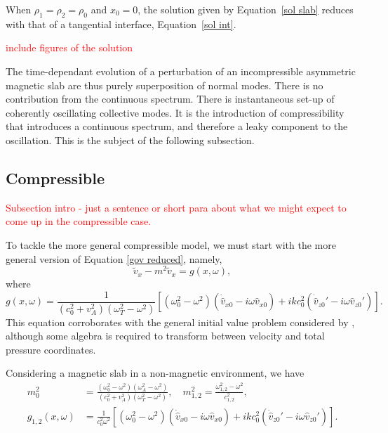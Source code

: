 \documentclass[12pt]{../style-files/ociamthesis}
\begin{document}
When $\rho_1 = \rho_2 = \rho_0$ and $x_0 = 0$, the solution given by Equation~\eqref{sol slab} reduces with that of a tangential interface, Equation~\eqref{sol int}.

\textcolor{red}{include figures of the solution}

The time-dependant evolution of a perturbation of an incompressible asymmetric magnetic slab are thus purely superposition of normal modes. There is no contribution from the continuous spectrum. There is instantaneous set-up of coherently oscillating collective modes. It is the introduction of compressibility that introduces a continuous spectrum, and therefore a leaky component to the oscillation. This is the subject of the following subsection.


\subsection{Compressible}

\textcolor{red}{Subsection intro - just a sentence or short para about what we might expect to come up in the compressible case.}

To tackle the more general compressible model, we must start with the more general version of Equation \eqref{gov reduced}, namely,
\begin{equation}
\tilde{v}_x - m^2 \tilde{v}_x = g(x, \omega),
\end{equation}
where
\begin{equation}
g(x, \omega) = \frac{1}{(c_0^2 + v_A^2)(\omega_T^2 - \omega^2)}\left[ (\omega_0^2 - \omega^2)\left(\dot{\hat{v}}_{x0} - i\omega \hat{v}_{x0}\right) + ikc_0^2\left( \dot{\hat{v}}_{z0}' - i\omega \hat{v}_{z0}'\right) \right].
\end{equation}
This equation corroborates with the general initial value problem considered by \cite{and_etal07}, although some algebra is required to transform between velocity and total pressure coordinates.

Considering a magnetic slab in a non-magnetic environment, we have
\begin{align}
m_0^2 &= \frac{(\omega_0^2 - \omega^2)(\omega_A^2 - \omega^2)}{(c_0^2 + v_A^2)(\omega_T^2 - \omega^2)}, \quad m_{1,2}^2 = \frac{\omega_{1,2}^2 - \omega^2}{c_{1,2}^2}, \\
g_{1,2}(x, \omega) &= \frac{1}{c_0^2\omega^2} \left[ (\omega_0^2 - \omega^2)\left(\dot{\hat{v}}_{x0} - i\omega \hat{v}_{x0}\right) + ikc_0^2\left( \dot{\hat{v}}_{z0}' - i\omega \hat{v}_{z0}'\right) \right].
\end{align}
\end{document}
